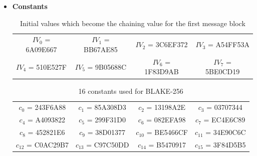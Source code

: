 \documentclass[12pt]{artikel3}                  %
\begin{document}
\begin{itemize}
\item {\bf Constants}
  \begin{table}[h]
    \begin{center}
      \begin{tabular}{ *{4}{c}}
        $IV_{0}$ = 6A09E667 & $IV_{1}$ = BB67AE85 & $IV_{2}$ = 3C6EF372 & $IV_{3}$ = A54FF53A \\
        $IV_{4}$ = 510E527F & $IV_{5}$ = 9B05688C & $IV_{6}$ = 1F83D9AB & $IV_{7}$ = 5BE0CD19 \\
      \end{tabular}
      \caption{Initial values which become the chaining value for the first message block}
    \end{center}
  \end{table}
  
  \begin{table}[h]
    \begin{center}
      \begin{tabular}{ *{4}{c}}
        $c_{0}$  = 243F6A88 & $c_{1}$  = 85A308D3 & $c_{2}$  = 13198A2E & $c_{3}$  = 03707344 \\
        $c_{4}$  = A4093822 & $c_{5}$  = 299F31D0 & $c_{6}$  = 082EFA98 & $c_{7}$  = EC4E6C89 \\
        $c_{8}$  = 452821E6 & $c_{9}$  = 38D01377 & $c_{10}$ = BE5466CF & $c_{11}$ = 34E90C6C \\
        $c_{12}$ = C0AC29B7 & $c_{13}$ = C97C50DD & $c_{14}$ = B5470917 & $c_{15}$ = 3F84D5B5 \\
      \end{tabular}
      \caption{16 constants used for BLAKE-256}
    \end{center}
  \end{table}


\end{itemize}
\end{document}
